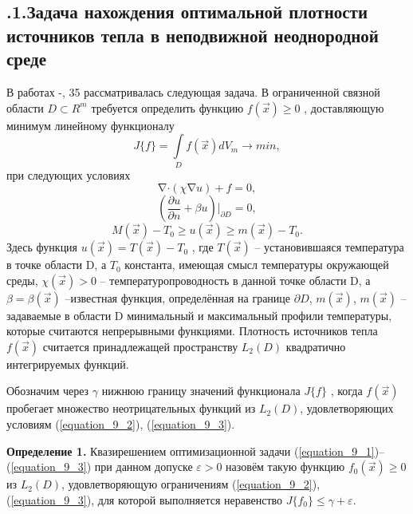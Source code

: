 \subsection*{ .1.Задача нахождения оптимальной плотности источников тепла в неподвижной неоднородной среде}

В работах \cite{literature_brusencev_2010}-\cite{literature_brusencev_2016}, 35 рассматривалась следующая задача. В ограниченной связной области $D{\subset} R^m$ требуется определить функцию $f(\vec x){\geq} 0$  , доставляющую минимум линейному функционалу
 			  \begin{equation} \label{equation_9_1}
              J\{f\}=\int\limits_D  f(\vec x)dV_m \to min,
              \end{equation}
при следующих условиях\[\mathop{\nabla} \cdot (\chi\mathop{\nabla}u)+ f=0,\]
              \begin{equation} \label{equation_9_2}
              (\frac{\partial u}{\partial n}+ \beta u)|_{\partial D}=0,
              \end{equation}
              \begin{equation} \label{equation_9_3}
              M(\vec x)-T_0\ge u(\vec x)\ge m(\vec x)-T_0.
              \end{equation}
Здесь функция $u(\vec x)=T(\vec x)-T_0$  , где  $T(\vec x)$  -- установившаяся температура в точке   области D, а  $T_0$ константа, имеющая смысл температуры окружающей среды,   $\chi(\vec x)>0$ -- температуропроводность в данной точке области D, а  $\beta=\beta(\vec x)$ --известная функция, определённая на границе $\partial D$, $m(\vec x)$,  $m(\vec x)$ --задаваемые в области D минимальный и максимальный профили температуры, которые считаются непрерывными функциями. Плотность источников тепла  $f(\vec x)$ считается принадлежащей пространству $L_2(D)$ квадратично интегрируемых функций.

Обозначим через $\gamma$ нижнюю границу значений функционала $J\{f\}$ , когда  $f(\vec x)$   пробегает множество неотрицательных функций из $L_2(D)$, удовлетворяющих условиям (\ref{equation_9_2}), (\ref{equation_9_3}).

\textbf{Определение 1. } Квазирешением оптимизационной задачи (\ref{equation_9_1})--(\ref{equation_9_3}) при данном допуске $\varepsilon {>}0$ назовём такую функцию $f_0(\vec x){\ge} 0$  из $L_2(D)$, удовлетворяющую ограничениям (\ref{equation_9_2}), (\ref{equation_9_3}), для которой выполняется неравенство $J\{f_0\}{\le} \gamma + \varepsilon$.

